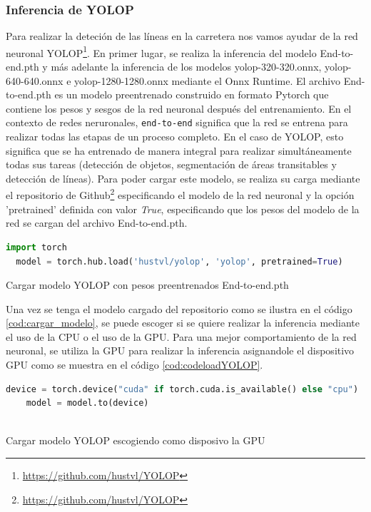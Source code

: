 \subsubsection{Inferencia de YOLOP}
\label{sec:Inferencia de YOLOP}

Para realizar la deteción de las líneas en la carretera nos vamos ayudar de la red neuronal YOLOP\footnote{\url{https://github.com/hustvl/YOLOP}}. En primer lugar, 
se realiza la inferencia del modelo End-to-end.pth y más adelante la inferencia de los modelos yolop-320-320.onnx, yolop-640-640.onnx e yolop-1280-1280.onnx mediante el Onnx Runtime. 
El archivo End-to-end.pth es un modelo preentrenado construido en formato Pytorch que contiene los pesos y sesgos de la red neuronal después del entrenamiento. En el contexto de 
redes neruronales, \texttt{end-to-end} significa que la red se entrena para realizar todas las etapas de un proceso completo. En el caso de YOLOP, esto significa que se ha entrenado de manera integral 
para realizar simultáneamente todas sus tareas (detección de objetos, segmentación de áreas transitables y detección de líneas). Para poder cargar este modelo, se realiza 
su carga mediante el repositorio de Github\footnote{\url{https://github.com/hustvl/YOLOP}}
especificando el modelo de la red neuronal y la opción 'pretrained' definida con valor \textit{True}, especificando que los pesos del modelo de la red se cargan del archivo End-to-end.pth.\newline

\begin{code}[h]
  \begin{lstlisting}[language=Python]
  import torch
  model = torch.hub.load('hustvl/yolop', 'yolop', pretrained=True)

  \end{lstlisting}
  \caption[Cargar modelo YOLOP con pesos preentrenados End-to-end.pth]{Cargar modelo YOLOP con pesos preentrenados End-to-end.pth}
  \label{cod:cargar_modelo}
  \end{code}  

Una vez se tenga el modelo cargado del repositorio como se ilustra en el código \ref{cod:cargar_modelo}, se puede escoger 
si se quiere realizar la inferencia mediante el uso de la CPU o el uso de la GPU. Para una mejor comportamiento de la red neuronal, se utiliza
la GPU para realizar la inferencia asignandole el dispositivo GPU como se muestra en el código \ref{cod:codeloadYOLOP}.\newline

  
\begin{code}[h]
    \begin{lstlisting}[language=Python]
    device = torch.device("cuda" if torch.cuda.is_available() else "cpu")
    model = model.to(device)
  
    \end{lstlisting}
    \caption[Cargar modelo YOLOP escogiendo como disposivo la GPU]{Cargar modelo YOLOP escogiendo como disposivo la GPU}
    \label{cod:codeloadYOLOP}
    \end{code}  

